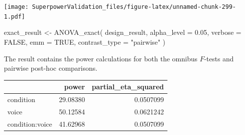 \documentclass[
]{book}
\newenvironment{Shaded}{\begin{snugshade}}{\end{snugshade}}
\newcommand{\AttributeTok}[1]{\textcolor[rgb]{0.77,0.63,0.00}{#1}}
\newcommand{\ConstantTok}[1]{\textcolor[rgb]{0.00,0.00,0.00}{#1}}
\newcommand{\DecValTok}[1]{\textcolor[rgb]{0.00,0.00,0.81}{#1}}
\newcommand{\FloatTok}[1]{\textcolor[rgb]{0.00,0.00,0.81}{#1}}
\newcommand{\FunctionTok}[1]{\textcolor[rgb]{0.00,0.00,0.00}{#1}}
\newcommand{\NormalTok}[1]{#1}
\newcommand{\OtherTok}[1]{\textcolor[rgb]{0.56,0.35,0.01}{#1}}
\newcommand{\SpecialCharTok}[1]{\textcolor[rgb]{0.00,0.00,0.00}{#1}}
\newcommand{\StringTok}[1]{\textcolor[rgb]{0.31,0.60,0.02}{#1}}
\begin{document}
\texttt{[image: SuperpowerValidation\_files/figure-latex/unnamed-chunk-299-1.pdf]}

\begin{Shaded}
\begin{Highlighting}[]
\NormalTok{exact\_result }\OtherTok{\textless{}{-}} \FunctionTok{ANOVA\_exact}\NormalTok{(}
\NormalTok{  design\_result,}
  \AttributeTok{alpha\_level =} \FloatTok{0.05}\NormalTok{,}
  \AttributeTok{verbose =} \ConstantTok{FALSE}\NormalTok{,}
  \AttributeTok{emm =} \ConstantTok{TRUE}\NormalTok{,}
  \AttributeTok{contrast\_type =} \StringTok{"pairwise"}
\NormalTok{)}
\end{Highlighting}
\end{Shaded}

The result contains the power calculations for both the omnibus \(F\)-tests and pairwise post-hoc comparisons.

\begin{Shaded}
\end{Shaded}

\begin{tabular}{l|r|r}
\hline
  & power & partial\_eta\_squared\\
\hline
condition & 29.08380 & 0.0507099\\
\hline
voice & 50.12584 & 0.0621242\\
\hline
condition:voice & 41.62968 & 0.0507099\\
\hline
\end{tabular}

\begin{Shaded}
\end{Shaded}
\end{document}
